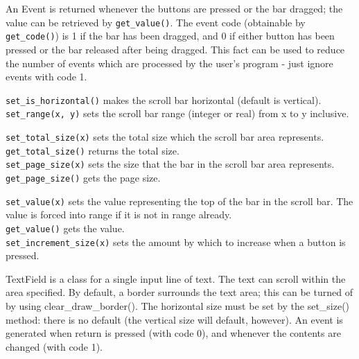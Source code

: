 
An Event is returned whenever the buttons are pressed or the bar
dragged; the value can be retrieved by \texttt{get\_value()}. The event code
(obtainable by \texttt{get\_code()}) is 1 if the bar has been dragged, and 0 if
either button has been pressed or the bar released after being dragged.
This fact can be used to reduce the number of events which are
processed by the user's program - just ignore events
with code 1.

\texttt{set\_is\_horizontal()} makes the scroll bar horizontal (default is
vertical).\\
\texttt{set\_range(x, y)} sets the scroll bar range (integer or real)
from x to y inclusive.

\texttt{set\_total\_size(x)} sets the total size which the scroll bar area
represents.\\
\texttt{get\_total\_size()} returns the total size.\\
\texttt{set\_page\_size(x)} sets the size that the bar in the scroll bar area
represents.\\
\texttt{get\_page\_size()} gets the page size.

\texttt{set\_value(x)} sets the value representing the top of the bar in the
scroll bar. The value is forced into range if it is not in range
already.\\
\texttt{get\_value()} gets the value.\\
\texttt{set\_increment\_size(x)} sets the amount by which to increase when a
button is pressed.


TextField is a class for a single input line of text. The text can
scroll within the area specified. By default, a border surrounds the
text area; this can be turned of by using clear\_draw\_border(). The
horizontal size must be set by the set\_size() method: there is no
default (the vertical size will default, however). An event is
generated when return is pressed (with code 0), and whenever the
contents are changed (with code 1).

